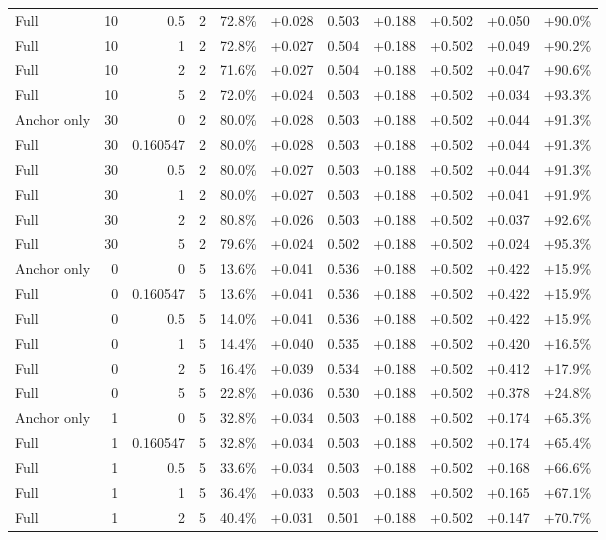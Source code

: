 \begin{table}[htbp]
\begin{tabular}{lrrrccccccc}
Full & 10 & 0.5 & 2 & 72.8\% & +0.028 & 0.503 & +0.188 & +0.502 & +0.050 & +90.0\% \\
Full & 10 & 1 & 2 & 72.8\% & +0.027 & 0.504 & +0.188 & +0.502 & +0.049 & +90.2\% \\
Full & 10 & 2 & 2 & 71.6\% & +0.027 & 0.504 & +0.188 & +0.502 & +0.047 & +90.6\% \\
Full & 10 & 5 & 2 & 72.0\% & +0.024 & 0.503 & +0.188 & +0.502 & +0.034 & +93.3\% \\
Anchor only & 30 & 0 & 2 & 80.0\% & +0.028 & 0.503 & +0.188 & +0.502 & +0.044 & +91.3\% \\
Full & 30 & 0.160547 & 2 & 80.0\% & +0.028 & 0.503 & +0.188 & +0.502 & +0.044 & +91.3\% \\
Full & 30 & 0.5 & 2 & 80.0\% & +0.027 & 0.503 & +0.188 & +0.502 & +0.044 & +91.3\% \\
Full & 30 & 1 & 2 & 80.0\% & +0.027 & 0.503 & +0.188 & +0.502 & +0.041 & +91.9\% \\
Full & 30 & 2 & 2 & 80.8\% & +0.026 & 0.503 & +0.188 & +0.502 & +0.037 & +92.6\% \\
Full & 30 & 5 & 2 & 79.6\% & +0.024 & 0.502 & +0.188 & +0.502 & +0.024 & +95.3\% \\
Anchor only & 0 & 0 & 5 & 13.6\% & +0.041 & 0.536 & +0.188 & +0.502 & +0.422 & +15.9\% \\
Full & 0 & 0.160547 & 5 & 13.6\% & +0.041 & 0.536 & +0.188 & +0.502 & +0.422 & +15.9\% \\
Full & 0 & 0.5 & 5 & 14.0\% & +0.041 & 0.536 & +0.188 & +0.502 & +0.422 & +15.9\% \\
Full & 0 & 1 & 5 & 14.4\% & +0.040 & 0.535 & +0.188 & +0.502 & +0.420 & +16.5\% \\
Full & 0 & 2 & 5 & 16.4\% & +0.039 & 0.534 & +0.188 & +0.502 & +0.412 & +17.9\% \\
Full & 0 & 5 & 5 & 22.8\% & +0.036 & 0.530 & +0.188 & +0.502 & +0.378 & +24.8\% \\
Anchor only & 1 & 0 & 5 & 32.8\% & +0.034 & 0.503 & +0.188 & +0.502 & +0.174 & +65.3\% \\
Full & 1 & 0.160547 & 5 & 32.8\% & +0.034 & 0.503 & +0.188 & +0.502 & +0.174 & +65.4\% \\
Full & 1 & 0.5 & 5 & 33.6\% & +0.034 & 0.503 & +0.188 & +0.502 & +0.168 & +66.6\% \\
Full & 1 & 1 & 5 & 36.4\% & +0.033 & 0.503 & +0.188 & +0.502 & +0.165 & +67.1\% \\
Full & 1 & 2 & 5 & 40.4\% & +0.031 & 0.501 & +0.188 & +0.502 & +0.147 & +70.7\% \\

\end{tabular}
\end{table}
